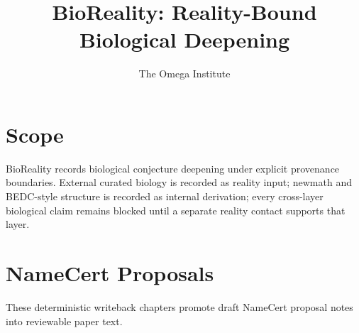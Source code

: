 \documentclass[11pt]{article}
\title{BioReality: Reality-Bound Biological Deepening}
\author{The Omega Institute}
\date{}
\begin{document}
\maketitle

\section{Scope}
BioReality records biological conjecture deepening under explicit provenance boundaries. External curated biology is recorded as reality input; newmath and BEDC-style structure is recorded as internal derivation; every cross-layer biological claim remains blocked until a separate reality contact supports that layer.





\section{NameCert Proposals}
These deterministic writeback chapters promote draft NameCert proposal notes into reviewable paper text.






























\end{document}
